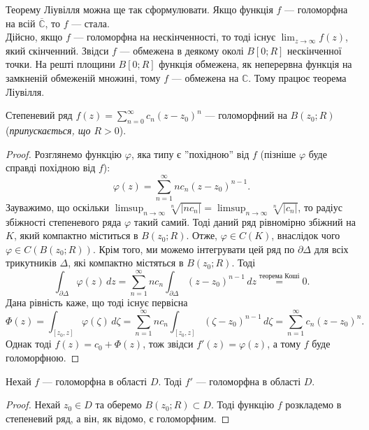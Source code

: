 \documentclass{math_library}
\begin{document}
\begin{remark}
Теорему Ліувілля можна ще так сформулювати. Якщо функція $f$ --- голоморфна на всій $\overline{\mathbb{C}}$, то $f$ --- стала.
\bigskip \\
Дійсно, якщо $f$ --- голоморфна на нескінченності, то тоді існує $\displaystyle\lim_{z \to \infty} f(z)$, який скінченний. Звідси $f$ --- обмежена в деякому околі $B[0;R]$ нескінченної точки. На решті площини $B[0;R]$ функція обмежена, як неперервна функція на замкненій обмеженій множині, тому $f$ --- обмежена на $\mathbb{C}$. Тому працює теорема Ліувілля.
\end{remark}

\begin{theorem}
Степеневий ряд $f(z) = \displaystyle\sum_{n=0}^\infty c_n (z-z_0)^n$ --- голоморфний на $B(z_0;R)$ (\textit{припускається, що $R>0$}).
\end{theorem}

\begin{proof}
Розглянемо функцію $\varphi$, яка типу є ''похідною'' від $f$ (пізніше $\varphi$ буде справді похідною від $f$):
\[
\varphi(z) = \sum_{n=1}^\infty n c_n (z-z_0)^{n-1}.
\]
Зауважимо, що оскільки $\limsup_{n \to \infty} \sqrt[n]{|n c_n|} = \limsup_{n \to \infty} \sqrt[n]{|c_n|}$, то радіус збіжності степеневого ряда $\varphi$ такий самий. Тоді даний ряд рівномірно збіжний на $K$, який компактно міститься в $B(z_0;R)$. Отже, $\varphi \in C(K)$, внаслідок чого $\varphi \in C(B(z_0;R))$. Крім того, ми можемо інтегрувати цей ряд по $\partial \Delta$ для всіх трикутників $\Delta$, які компактно містяться в $B(z_0;R)$. Тоді
\[
\int_{\partial \Delta} \varphi(z)\,dz = \sum_{n=1}^\infty n c_n \int_{\partial \Delta} (z-z_0)^{n-1}\,dz \overset{\text{теорема Коші}}{=} 0.
\]
Дана рівність каже, що тоді існує первісна
\[
\Phi(z) = \int_{[z_0,z]} \varphi(\zeta)\,d\zeta = \sum_{n=1}^\infty n c_n \int_{[z_0,z]} (\zeta-z_0)^{n-1}\,d\zeta = \sum_{n=1}^\infty c_n (z-z_0)^n.
\]
Однак тоді $f(z) = c_0 + \Phi(z)$, тож звідси $f'(z) = \varphi(z)$, а тому $f$ буде голоморфною.
\end{proof}

\begin{theorem}
Нехай $f$ --- голоморфна в області $D$. Тоді $f'$ --- голоморфна в області $D$.
\end{theorem}

\begin{proof}
Нехай $z_0 \in D$ та оберемо $B(z_0;R) \subset D$. Тоді функцію $f$ розкладемо в степеневий ряд, а він, як відомо, є голоморфним.
\end{proof}
\end{document}
